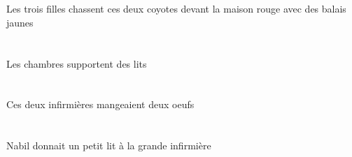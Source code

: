 \begin{exe}
\INDPlOblP{}   \jauneCPlP{}   \balaiCPlOblP{}   \AVECP{}   \DEFPlErgP{}   \troisCPlP{}   \filleCPlErgP{}   \DEMDuAbsP{}    \DEFSgOblP{}   \rougeDSgP{}   \maisonDSgOblP{}   \DEVANTP{}   \coyoteADuAbsP{}  \chasserVtPrsADuP{}\\
\INDPlOblG{}   \jauneCPlG{}   \balaiCPlOblG{}   \AVECG{}   \DEFPlErgG{}   \troisCPlG{}   \filleCPlErgG{}   \DEMDuAbsG{}    \DEFSgOblG{}   \rougeDSgG{}   \maisonDSgOblG{}   \DEVANTG{}   \coyoteADuAbsG{}  \chasserVtPrsADuG{}\\
Les trois filles chassent ces deux coyotes devant la maison rouge avec des balais jaunes
\ex\glll
\DEFPlErg{}   \chambreBPlErg{}   \INDPlAbs{}   \litDPlAbs{}  \supporterVtPrsDPl{}\\
\DEFPlErgP{}   \chambreBPlErgP{}   \INDPlAbsP{}   \litDPlAbsP{}  \supporterVtPrsDPlP{}\\
\DEFPlErgG{}   \chambreBPlErgG{}   \INDPlAbsG{}   \litDPlAbsG{}  \supporterVtPrsDPlG{}\\
Les chambres supportent des lits
\ex\glll
\DEMDuErg{}   \infirmiereBDuErg{}   \INDDuAbs{}   \oeufDDuAbs{}  \mangerVtPstDDu{}\\
\DEMDuErgP{}   \infirmiereBDuErgP{}   \INDDuAbsP{}   \oeufDDuAbsP{}  \mangerVtPstDDuP{}\\
\DEMDuErgG{}   \infirmiereBDuErgG{}   \INDDuAbsG{}   \oeufDDuAbsG{}  \mangerVtPstDDuG{}\\
Ces deux infirmières mangeaient deux oeufs
\ex\glll
\INDSgErg{}   \NabilBSgErg{}    \DEFSgDat{}   \grandBSg{}   \infirmiereBSgDat{}   \INDSgAbs{}   \petitDSg{}   \litDSgAbs{}  \donnerVdPstDSg{}\\
\INDSgErgP{}   \NabilBSgErgP{}    \DEFSgDatP{}   \grandBSgP{}   \infirmiereBSgDatP{}   \INDSgAbsP{}   \petitDSgP{}   \litDSgAbsP{}  \donnerVdPstDSgP{}\\
\INDSgErgG{}   \NabilBSgErgG{}    \DEFSgDatG{}   \grandBSgG{}   \infirmiereBSgDatG{}   \INDSgAbsG{}   \petitDSgG{}   \litDSgAbsG{}  \donnerVdPstDSgG{}\\
Nabil donnait un petit lit à la grande infirmière
\ex\glll
\INDDuAbs{}   \cafeDDuAbs{}    \DEFPlObl{}    \DEFSgObl{}   \chambreBSgObl{}   \DE{}   \coussinAPlObl{}   \SUR{}  \tomberViPstDDu{}\\
\INDDuAbsP{}   \cafeDDuAbsP{}    \DEFPlOblP{}    \DEFSgOblP{}   \chambreBSgOblP{}   \DEP{}   \coussinAPlOblP{}   \SURP{}  \tomberViPstDDuP{}\\
\INDDuAbsG{}   \cafeDDuAbsG{}    \DEFPlOblG{}    \DEFSgOblG{}   \chambreBSgOblG{}   \DEG{}   \coussinAPlOblG{}   \SURG{}  \tomberViPstDDuG{}\\

\end{exe}
